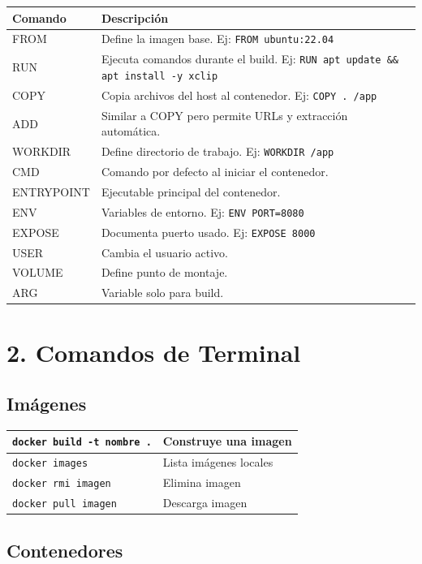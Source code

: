 \documentclass[a4paper,10pt]{article}
\begin{document}
\begin{longtable}{|p{3cm}|p{11cm}|}
\hline
\textbf{Comando} & \textbf{Descripción} \\
\hline
FROM & Define la imagen base. Ej: \texttt{FROM ubuntu:22.04} \\
\hline
RUN & Ejecuta comandos durante el build. Ej: \texttt{RUN apt update \&\& apt install -y xclip} \\
\hline
COPY & Copia archivos del host al contenedor. Ej: \texttt{COPY . /app} \\
\hline
ADD & Similar a COPY pero permite URLs y extracción automática. \\
\hline
WORKDIR & Define directorio de trabajo. Ej: \texttt{WORKDIR /app} \\
\hline
CMD & Comando por defecto al iniciar el contenedor. \\
\hline
ENTRYPOINT & Ejecutable principal del contenedor. \\
\hline
ENV & Variables de entorno. Ej: \texttt{ENV PORT=8080} \\
\hline
EXPOSE & Documenta puerto usado. Ej: \texttt{EXPOSE 8000} \\
\hline
USER & Cambia el usuario activo. \\
\hline
VOLUME & Define punto de montaje. \\
\hline
ARG & Variable solo para build. \\
\hline
\end{longtable}

\section*{2. Comandos de Terminal}

\subsection*{Imágenes}

\begin{longtable}{|p{5cm}|p{9cm}|}
\hline
\texttt{docker build -t nombre .} & Construye una imagen \\
\hline
\texttt{docker images} & Lista imágenes locales \\
\hline
\texttt{docker rmi imagen} & Elimina imagen \\
\hline
\texttt{docker pull imagen} & Descarga imagen \\
\hline
\end{longtable}

\subsection*{Contenedores}
\end{document}
